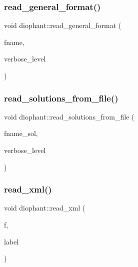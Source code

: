 \mbox{\label{classdiophant_a1887f195bdb2f597aa7eedc55cb8a211}} 
\subsubsection{\texorpdfstring{read\+\_\+general\+\_\+format()}{read\_general\_format()}}
{\footnotesize\ttfamily void diophant\+::read\+\_\+general\+\_\+format (\begin{DoxyParamCaption}\item[{const \mbox{\hyperlink{galois_8h_ab6cc7b4aeb6ea31aba2b3fbfc83ff5e6}{B\+Y\+TE}} $\ast$}]{fname,  }\item[{\mbox{\hyperlink{galois_8h_a09fddde158a3a20bd2dcadb609de11dc}{I\+NT}}}]{verbose\+\_\+level }\end{DoxyParamCaption})}

\mbox{\label{classdiophant_a4077aed588c27beff6c309f096c6fef5}} 
\subsubsection{\texorpdfstring{read\+\_\+solutions\+\_\+from\+\_\+file()}{read\_solutions\_from\_file()}}
{\footnotesize\ttfamily void diophant\+::read\+\_\+solutions\+\_\+from\+\_\+file (\begin{DoxyParamCaption}\item[{const \mbox{\hyperlink{galois_8h_ab6cc7b4aeb6ea31aba2b3fbfc83ff5e6}{B\+Y\+TE}} $\ast$}]{fname\+\_\+sol,  }\item[{\mbox{\hyperlink{galois_8h_a09fddde158a3a20bd2dcadb609de11dc}{I\+NT}}}]{verbose\+\_\+level }\end{DoxyParamCaption})}

\mbox{\label{classdiophant_a56bf6e90f2b106f051f0735bb118cec6}} 
\subsubsection{\texorpdfstring{read\+\_\+xml()}{read\_xml()}}
{\footnotesize\ttfamily void diophant\+::read\+\_\+xml (\begin{DoxyParamCaption}\item[{ifstream \&}]{f,  }\item[{\mbox{\hyperlink{galois_8h_ab6cc7b4aeb6ea31aba2b3fbfc83ff5e6}{B\+Y\+TE}} $\ast$}]{label }\end{DoxyParamCaption})}


